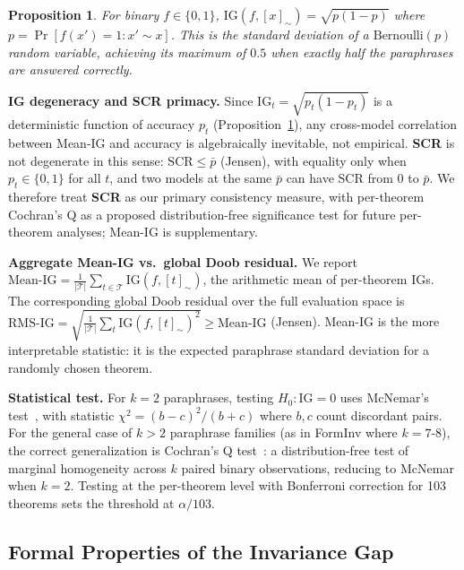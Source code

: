 \documentclass{article}
\newcommand{\IG}{\mathrm{IG}}
\newcommand{\Eclass}[1]{[#1]_{\sim}}
\newtheorem{proposition}{Proposition}
\begin{document}
\begin{proposition}
\label{prop:ig_binary}
For binary $f \in \{0,1\}$, $\IG(f, \Eclass{x}) = \sqrt{p(1-p)}$ where $p = \Pr[f(x')=1 : x' \sim x]$.
This is the standard deviation of a $\mathrm{Bernoulli}(p)$ random variable, achieving its maximum of $0.5$ when
exactly half the paraphrases are answered correctly.
\end{proposition}

\noindent\textbf{IG degeneracy and SCR primacy.}
Since $\IG_t = \sqrt{p_t(1-p_t)}$ is a deterministic function of accuracy $p_t$
(Proposition~\ref{prop:ig_binary}), any cross-model correlation between Mean-IG and accuracy
is algebraically inevitable, not empirical.
\textbf{SCR} is not degenerate in this sense: $\mathrm{SCR} \leq \bar{p}$ (Jensen), with equality only when
$p_t \in \{0,1\}$ for all $t$, and two models at the same $\bar{p}$ can have SCR from $0$ to $\bar{p}$.
We therefore treat \textbf{SCR} as our primary consistency measure, with per-theorem Cochran's Q as a proposed distribution-free significance test for future per-theorem analyses;
Mean-IG is supplementary.
\label{rem:ig_degeneracy}

\noindent\textbf{Aggregate Mean-IG vs.\ global Doob residual.}
We report $\mathrm{Mean\text{-}IG} = \frac{1}{|\mathcal{T}|}\sum_{t \in \mathcal{T}} \IG(f, \Eclass{t})$,
the arithmetic mean of per-theorem IGs.
The corresponding global Doob residual over the full evaluation space is
$\mathrm{RMS\text{-}IG} = \sqrt{\frac{1}{|\mathcal{T}|}\sum_{t}\IG(f,\Eclass{t})^2} \geq \mathrm{Mean\text{-}IG}$ (Jensen).
Mean-IG is the more interpretable statistic: it is the expected paraphrase standard deviation
for a randomly chosen theorem.

\textbf{Statistical test.} For $k = 2$ paraphrases, testing $H_0: \IG = 0$ uses McNemar's test~\citep{mcnemar1947},
with statistic $\chi^2 = (b-c)^2/(b+c)$ where $b,c$ count discordant pairs.
For the general case of $k > 2$ paraphrase families (as in FormInv where $k = 7$-$8$),
the correct generalization is Cochran's Q test~\citep{cochran1950}: a distribution-free test
of marginal homogeneity across $k$ paired binary observations, reducing to McNemar when $k = 2$.
Testing at the per-theorem level with Bonferroni correction for 103 theorems sets the threshold at $\alpha/103$.

\subsection{Formal Properties of the Invariance Gap}
\label{sec:ig_theory}
\end{document}
